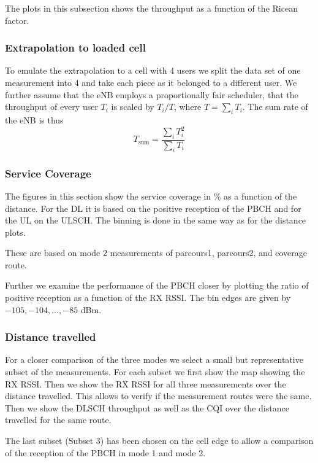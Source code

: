 \documentclass[a4paper,10pt]{article}
\begin{document}
The plots in this subsection shows the throughput as a function of the Ricean factor.

\subsubsection{Extrapolation to loaded cell}

To emulate the extrapolation to a cell with 4 users we split the data set of one measurement into 4 and take each piece as it belonged to a different user. We further assume that the eNB employs a proportionally fair scheduler, that the throughput of every user $T_i$ is scaled by $T_i/T$, where $T=\sum_i T_i$. The sum rate of the eNB is thus
\begin{equation}
 T_{\mathrm{sum}} = \frac{\sum_i T_i^2}{\sum_i T_i}
\end{equation}

\subsubsection{Service Coverage}

The figures in this section show the service coverage in \% as a function of the distance. For the DL it is based on the positive reception of the PBCH and for the UL on the ULSCH. The binning is done in the same way as for the distance plots.

These are based on mode 2 measurements of parcours1, parcours2, and coverage route. 

Further we examine the performance of the PBCH closer by plotting the ratio of positive reception as a function of the RX RSSI. The bin edges are given by  $-105, -104, \ldots, -85$ dBm.

\subsubsection{Distance travelled}
\label{sec:dist_travelled}

For a closer comparison of the three modes we select a small but representative subset of the measurements. For each subset we first show the map showing the RX RSSI. Then we show the RX RSSI for all three measurements over the distance travelled. This allows to verify if the measurement routes were the same. Then we show the DLSCH throughput as well as the CQI over the distance travelled for the same route. 

The last subset (Subset 3) has been chosen on the cell edge to allow a comparison of the reception of the PBCH in mode 1 and mode 2.
\end{document}
